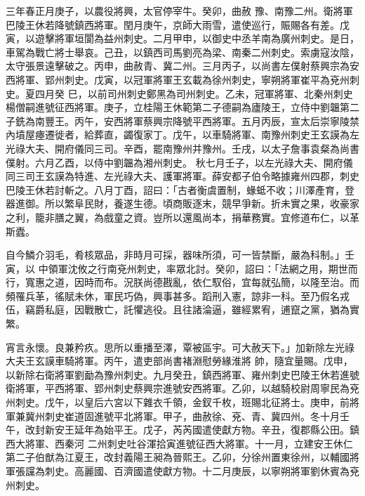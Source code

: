\begin{pinyinscope}
 三年春正月庚子，以農役將興，太官停宰牛。癸卯，曲赦
 豫、南豫二州。衛將軍巴陵王休若降號鎮西將軍。閏月庚午，京師大雨雪，遣使巡行，賑賜各有差。戊寅，以遊擊將軍垣閬為益州刺史。二月甲申，以御史中丞羊南為廣州刺史。是日，車駕為戰亡將士舉哀。己丑，以鎮西司馬劉亮為梁、南秦二州刺史。索虜寇汝陰，太守張景遠擊破之。丙申，曲赦青、冀二州。三月丙子，以尚書左僕射蔡興宗為安西將軍、郢州刺史。戊寅，以冠軍將軍王玄載為徐州刺史，寧朔將軍崔平為兗州刺史。夏四月癸
 巳，以前司州刺史鄭黑為司州刺史。乙未，冠軍將軍、北秦州刺史楊僧嗣進號征西將軍。庚子，立桂陽王休範第二子德嗣為廬陵王，立侍中劉韞第二子銑為南豐王。丙午，安西將軍蔡興宗降號平西將軍。五月丙辰，宣太后崇寧陵禁內墳屋瘞遷徙者，給葬直，蠲復家丁。戊午，以車騎將軍、南豫州刺史王玄謨為左光祿大夫、開府儀同三司。辛酉，罷南豫州并豫州。壬戌，以太子詹事袁粲為尚書僕射。六月乙酉，以侍中劉韞為湘州刺史。
 秋七月壬子，以左光祿大夫、開府儀同三司王玄謨為特進、左光祿大夫、護軍將軍。薛安都子伯令略據雍州四郡，刺史巴陵王休若討斬之。八月丁酉，詔曰：「古者衡虞置制，蝝蚳不收；川澤產育，登器進御。所以繁阜民財，養遂生德。頃商販逐末，競早爭新。折未實之果，收豪家之利，籠非膳之翼，為戲童之資。豈所以還風尚本，捐華務實。宜修道布仁，以革斯蠹。



 自今鱗介羽毛，肴核眾品，非時月可採，器味所須，可一皆禁斷，嚴為科制。」壬寅，以
 中領軍沈攸之行南兗州刺史，率眾北討。癸卯，詔曰：「法網之用，期世而行，寬惠之道，因時而布。況朕尚德戡亂，依仁馭俗，宜每就弘簡，以隆至治。而頻罹兵革，徭賦未休，軍民巧偽，興事甚多。蹈刑入憲，諒非一科。至乃假名戎伍，竊爵私庭，因戰散亡，託懼逃役。且往諸淪逼，雖經累宥，逋竄之黨，猶為實繁。



 宵言永懷。良兼矜疚。思所以重播至澤，覃被區宇。可大赦天下。」加新除左光祿大夫王玄謨車騎將軍。丙午，遣吏部尚書褚淵慰勞緣淮將
 帥，隨宜量賜。戊申，以新除右衛將軍劉勔為豫州刺史。九月癸丑，鎮西將軍、雍州刺史巴陵王休若進號衛將軍，平西將軍、郢州刺史蔡興宗進號安西將軍。乙卯，以越騎校尉周寧民為兗州刺史。戊午，以皇后六宮以下雜衣千領，金釵千枚，班賜北征將士。庚申，前將軍兼冀州刺史崔道固進號平北將軍。甲子，曲赦徐、兗、青、冀四州。冬十月壬午，改封新安王延年為始平王。戊子，芮芮國遣使獻方物。辛丑，復郡縣公田。鎮西大將軍、西秦河
 二州刺史吐谷渾拾寅進號征西大將軍。十一月，立建安王休仁第二子伯猷為江夏王，改封義陽王昶為晉熙王。乙卯，分徐州置東徐州，以輔國將軍張讜為刺史。高麗國、百濟國遣使獻方物。十二月庚辰，以寧朔將軍劉休賓為兗州刺史。




\end{pinyinscope}
